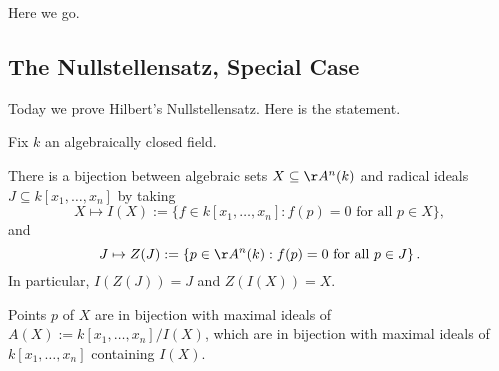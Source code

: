 
Here we go.

\subsection{The Nullstellensatz, Special Case}
Today we prove Hilbert's Nullstellensatz. Here is the statement.
\begin{theorem}[Nullstellensatz] \label{thm:nullstellensatz}
	Fix $k$ an algebraically closed field.
	\begin{listalph}
		\item There is a bijection between algebraic sets $X\subseteq\AA^n(k)$ and radical ideals $J\subseteq k[x_1,\ldots,x_n]$ by taking
		\[X\mapsto I(X):=\{f\in k[x_1,\ldots,x_n]:f(p)=0\text{ for all }p\in X\},\]
		and
		\[J\mapsto Z(J):=\left\{p\in\AA^n(k):f(p)=0\text{ for all }p\in J\right\}.\]
		In particular, $I(Z(J))=J$ and $Z(I(X))=X$.
		\item Points $p$ of $X$ are in bijection with maximal ideals of $A(X):=k[x_1,\ldots,x_n]/I(X)$, which are in bijection with maximal ideals of $k[x_1,\ldots,x_n]$ containing $I(X)$.
	\end{listalph}
\end{theorem}
